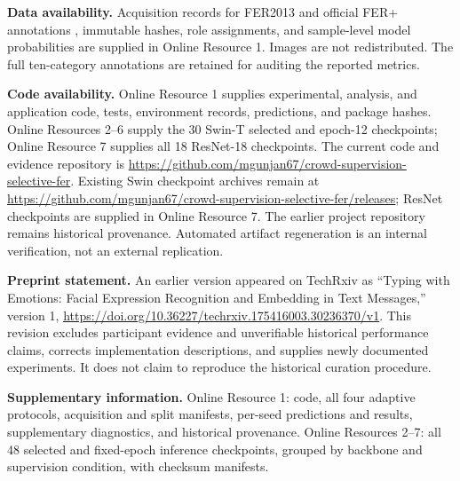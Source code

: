 \documentclass[pdflatex,sn-mathphys-num]{sn-jnl}
\begin{document}
\noindent\textbf{Data availability.} Acquisition records for FER2013 \cite{goodfellow2013fer} and official FER+ annotations \cite{barsoum2016ferplus}, immutable hashes, role assignments, and sample-level model probabilities are supplied in Online Resource 1. Images are not redistributed. The full ten-category annotations are retained for auditing the reported metrics.

\noindent\textbf{Code availability.} Online Resource 1 supplies experimental, analysis, and application code, tests, environment records, predictions, and package hashes. Online Resources 2--6 supply the 30 Swin-T selected and epoch-12 checkpoints; Online Resource 7 supplies all 18 ResNet-18 checkpoints. The current code and evidence repository is \url{https://github.com/mgunjan67/crowd-supervision-selective-fer}. Existing Swin checkpoint archives remain at \url{https://github.com/mgunjan67/crowd-supervision-selective-fer/releases}; ResNet checkpoints are supplied in Online Resource 7. The earlier project repository remains historical provenance. Automated artifact regeneration is an internal verification, not an external replication.

\noindent\textbf{Preprint statement.} An earlier version appeared on TechRxiv as ``Typing with Emotions: Facial Expression Recognition and Embedding in Text Messages,'' version 1, \url{https://doi.org/10.36227/techrxiv.175416003.30236370/v1}. This revision excludes participant evidence and unverifiable historical performance claims, corrects implementation descriptions, and supplies newly documented experiments. It does not claim to reproduce the historical curation procedure.

\noindent\textbf{Supplementary information.} Online Resource 1: code, all four adaptive protocols, acquisition and split manifests, per-seed predictions and results, supplementary diagnostics, and historical provenance. Online Resources 2--7: all 48 selected and fixed-epoch inference checkpoints, grouped by backbone and supervision condition, with checksum manifests.


\end{document}
